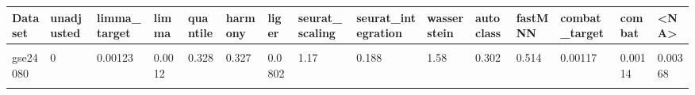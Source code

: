 \centering
\begin{tabular}{l|l|l|l|l|l|l|l|l|l|l|l|l|l|l}
\hline
Dataset & unadjusted & limma\_target & limma & quantile & harmony & liger & seurat\_scaling & seurat\_integration & wasserstein & autoclass & fastMNN & combat\_target & combat & <NA>\\
\hline
\cellcolor{gray!10}{gse20194} & \cellcolor{gray!10}{0} & \cellcolor{gray!10}{0.00266} & \cellcolor{gray!10}{0.00274} & \cellcolor{gray!10}{0.346} & \cellcolor{gray!10}{0.344} & \cellcolor{gray!10}{0.105} & \cellcolor{gray!10}{1.07} & \cellcolor{gray!10}{0.284} & \cellcolor{gray!10}{2.58} & \cellcolor{gray!10}{0.126} & \cellcolor{gray!10}{0.479} & \cellcolor{gray!10}{0.00247} & \cellcolor{gray!10}{0.00257} & \cellcolor{gray!10}{0.0045}\\
\hline
gse24080 & 0 & 0.00123 & 0.0012 & 0.328 & 0.327 & 0.0802 & 1.17 & 0.188 & 1.58 & 0.302 & 0.514 & 0.00117 & 0.00114 & 0.00368\\
\hline
\cellcolor{gray!10}{gse49711} & \cellcolor{gray!10}{0} & \cellcolor{gray!10}{0.201} & \cellcolor{gray!10}{0.201} & \cellcolor{gray!10}{16.3} & \cellcolor{gray!10}{16.2} & \cellcolor{gray!10}{266} & \cellcolor{gray!10}{281} & \cellcolor{gray!10}{37.3} & \cellcolor{gray!10}{5.89} & \cellcolor{gray!10}{3.62} & \cellcolor{gray!10}{282} & \cellcolor{gray!10}{0.446} & \cellcolor{gray!10}{0.425} & \cellcolor{gray!10}{0.468}\\
\hline
\end{tabular}